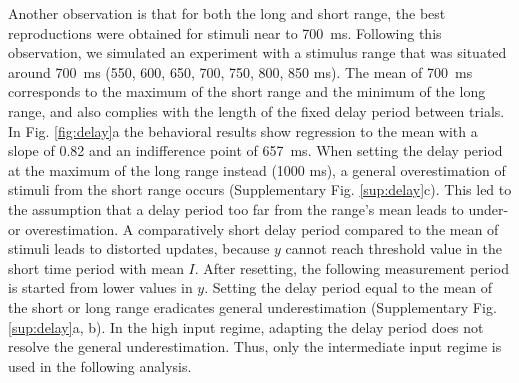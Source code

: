 \documentclass[10pt]{article}
\begin{document}
Another observation is that for both the long and short range, the best reproductions were obtained for stimuli near to 700~ms.
Following this observation, we simulated an experiment with a stimulus range that was situated around 700~ms (550, 600, 650, 700, 750, 800, 850 ms). 
The mean of 700~ms corresponds to the maximum of the short range and the minimum of the long range, and also complies with the length of the fixed delay period between trials.
In Fig. \ref{fig:delay}a the behavioral results show regression to the mean with a slope of 0.82 and an indifference point of 657~ms.
When setting the delay period at the maximum of the long range instead (1000 ms), a general overestimation of stimuli from the short range occurs (Supplementary Fig. \ref{sup:delay}c).
This led to the assumption that a delay period too far from the range's mean leads to under- or overestimation. 
A comparatively short delay period compared to the mean of stimuli leads to distorted updates, because $y$ cannot reach threshold value in the short time period with mean $I$. 
After resetting, the following measurement period is started from lower values in $y$. 
Setting the delay period equal to the mean of the short or long range 
eradicates general underestimation (Supplementary Fig. \ref{sup:delay}a, b).
In the high input regime, adapting the delay period does not resolve the general underestimation. Thus, only the intermediate input regime is used in the following analysis.
\end{document}
